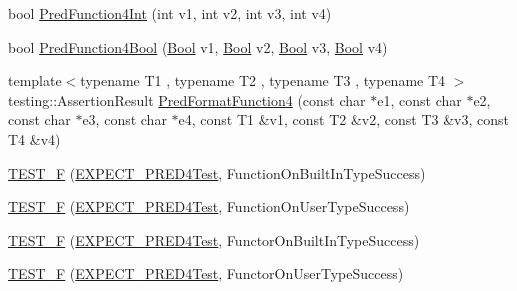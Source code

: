 \begin{DoxyCompactItemize}
\item 
bool \mbox{\hyperlink{googletest-master_2googletest_2test_2gtest__pred__impl__unittest_8cc_a105a045112a34fb2b65360c0d5daf81e}{Pred\+Function4\+Int}} (int v1, int v2, int v3, int v4)
\item 
bool \mbox{\hyperlink{googletest-master_2googletest_2test_2gtest__pred__impl__unittest_8cc_a5d842d3bce2d16793299e77d1cb5c980}{Pred\+Function4\+Bool}} (\mbox{\hyperlink{struct_bool}{Bool}} v1, \mbox{\hyperlink{struct_bool}{Bool}} v2, \mbox{\hyperlink{struct_bool}{Bool}} v3, \mbox{\hyperlink{struct_bool}{Bool}} v4)
\item 
{\footnotesize template$<$typename T1 , typename T2 , typename T3 , typename T4 $>$ }\\testing\+::\+Assertion\+Result \mbox{\hyperlink{googletest-master_2googletest_2test_2gtest__pred__impl__unittest_8cc_a9fbd4c3333dcc98c0cfee19ce28bc2b1}{Pred\+Format\+Function4}} (const char $\ast$e1, const char $\ast$e2, const char $\ast$e3, const char $\ast$e4, const T1 \&v1, const T2 \&v2, const T3 \&v3, const T4 \&v4)
\item 
\mbox{\hyperlink{googletest-master_2googletest_2test_2gtest__pred__impl__unittest_8cc_a15e705507c885f4d89c6f9d9d1601c96}{T\+E\+S\+T\+\_\+F}} (\mbox{\hyperlink{googletest-master_2googletest_2test_2gtest__pred__impl__unittest_8cc_abbf7ac63ea663c0dec815df5770cd2a8}{E\+X\+P\+E\+C\+T\+\_\+\+P\+R\+E\+D4\+Test}}, Function\+On\+Built\+In\+Type\+Success)
\item 
\mbox{\hyperlink{googletest-master_2googletest_2test_2gtest__pred__impl__unittest_8cc_a666c4a544439533ef0fbac4fad0b3cf4}{T\+E\+S\+T\+\_\+F}} (\mbox{\hyperlink{googletest-master_2googletest_2test_2gtest__pred__impl__unittest_8cc_abbf7ac63ea663c0dec815df5770cd2a8}{E\+X\+P\+E\+C\+T\+\_\+\+P\+R\+E\+D4\+Test}}, Function\+On\+User\+Type\+Success)
\item 
\mbox{\hyperlink{googletest-master_2googletest_2test_2gtest__pred__impl__unittest_8cc_a49b56c08cb83d1e00a1768dd9f6b8d95}{T\+E\+S\+T\+\_\+F}} (\mbox{\hyperlink{googletest-master_2googletest_2test_2gtest__pred__impl__unittest_8cc_abbf7ac63ea663c0dec815df5770cd2a8}{E\+X\+P\+E\+C\+T\+\_\+\+P\+R\+E\+D4\+Test}}, Functor\+On\+Built\+In\+Type\+Success)
\item 
\mbox{\hyperlink{googletest-master_2googletest_2test_2gtest__pred__impl__unittest_8cc_ac6b2261e169a9c32d631ac71909a0458}{T\+E\+S\+T\+\_\+F}} (\mbox{\hyperlink{googletest-master_2googletest_2test_2gtest__pred__impl__unittest_8cc_abbf7ac63ea663c0dec815df5770cd2a8}{E\+X\+P\+E\+C\+T\+\_\+\+P\+R\+E\+D4\+Test}}, Functor\+On\+User\+Type\+Success)

\end{DoxyCompactItemize}
